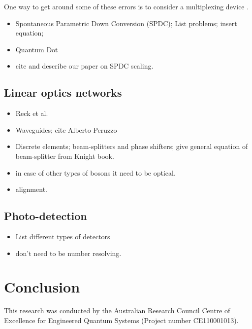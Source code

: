 \documentclass[aps,pra,twocolumn,amsmath,amssymb,nofootinbib,superscriptaddress]{revtex4}
\begin{document}
One way to get around some of these errors is to consider a multiplexing device \cite{}.

\begin{itemize}
\item Spontaneous Parametric Down Conversion (SPDC); List problems; insert equation; 
\item Quantum Dot
\item cite and describe our paper on SPDC scaling.
\end{itemize}

\subsection{Linear optics networks}

\begin{itemize}
\item Reck et al.
\item Waveguides; cite Alberto Peruzzo
\item Discrete elements; beam-splitters and phase shifters; give general equation of beam-splitter from Knight book.
\item in case of other types of bosons it need to be optical.
\item alignment.
\end{itemize}

\subsection{Photo-detection}

\begin{itemize}
\item List different types of detectors
\item don't need to be number resolving.
\end{itemize}

\section{Conclusion}

%
%

\begin{acknowledgments}
This research was conducted by the Australian Research Council Centre of Excellence for Engineered Quantum Systems (Project number CE110001013).
\end{acknowledgments}

%
%


\end{document}
